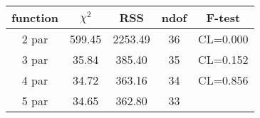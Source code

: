 \begin{tabular}{c|c|c|c|c}
function & $\chi^2$ & RSS & ndof & F-test \\
\hline
2 par & 599.45 & 2253.49 & 36 & CL=0.000 \\
3 par & 35.84 & 385.40 & 35 & CL=0.152 \\
4 par & 34.72 & 363.16 & 34 & CL=0.856 \\
5 par & 34.65 & 362.80 & 33 & \\
\hline
\end{tabular}